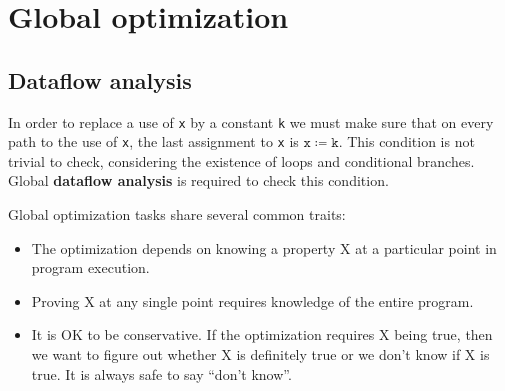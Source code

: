 \section{Global optimization}
\subsection{Dataflow analysis}
In order to replace a use of \texttt{x} by a constant \texttt{k} we must make sure that on every path to the use of \texttt{x}, the last assignment to \texttt{x} is $\mathtt{x\coloneqq k}$. This condition is not trivial to check, considering the existence of loops and conditional branches. Global \textbf{dataflow analysis} is required to check this condition.

Global optimization tasks share several common traits:
\begin{itemize}
\item The optimization depends on knowing a property X at a particular point in program execution.
\item Proving X at any single point requires knowledge of the entire program.
\item It is OK to be conservative. If the optimization requires X being true, then we want to figure out whether X is definitely true or we don't know if X is true. It is always safe to say ``don't know''.
\end{itemize}
